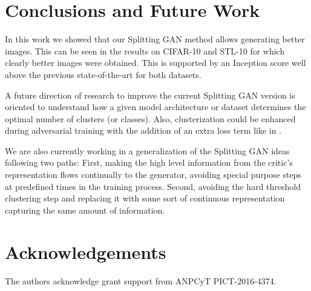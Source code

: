\documentclass[times,twocolumn]{article}
\begin{document}
 
\section{Conclusions and Future Work}
In this work we showed that our Splitting GAN method allows generating better images. This can be seen in the results on CIFAR-10 and STL-10 for which clearly better images were obtained. This is supported by an Inception score well above the previous state-of-the-art for both datasets. 

A future direction of research to improve the current Splitting GAN version is oriented to understand how a given model architecture or dataset determines the optimal number of clusters (or classes). Also, clusterization could be enhanced during adversarial training with the addition of an extra loss term like in \cite{Wen2016}.

We are also currently working in a generalization of the Splitting GAN ideas following two paths: First, making the high level information from the critic's representation flows continually to the generator, avoiding special purpose steps at predefined times in the training process. Second, avoiding the hard threshold clustering step and replacing it with some sort of continuous representation capturing the same amount of information.
\section{Acknowledgements}
The authors acknowledge grant support from ANPCyT PICT-2016-4374.



\end{document}
